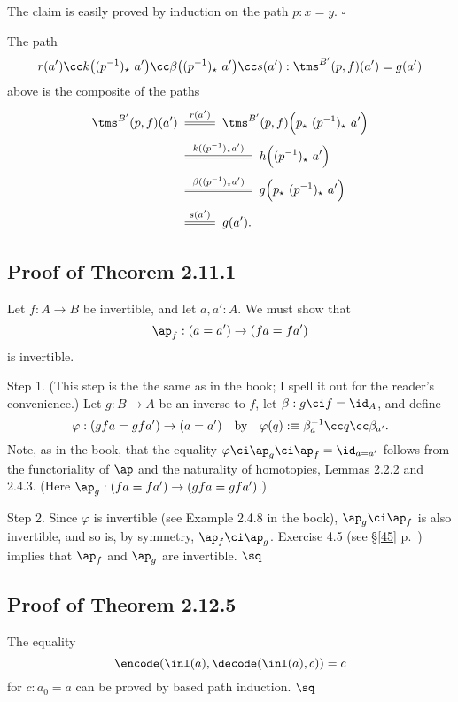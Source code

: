 \documentclass[12pt]{article}
\begin{document}
The claim is easily proved by induction on the path $p:x=y$. $\square$

The path 
$$
r(a')\cc k\big((p^{-1})_\star\ a'\big)\cc\beta\big((p^{-1})_\star\ a'\big)\cc s(a'):\tms^{B'}(p,f)(a')=g(a')
$$ 
above is the composite of the paths
\begin{align*}
\tms^{B'}(p,f)(a')&\xymatrix{\ar@1{=}[r]^{r(a')}&}\tms^{B'}(p,f)\Big(p_\star\ (p^{-1})_\star\ a'\Big)\\ 
&\xymatrix{\ar@1{=}[rr]^{k((p^{-1})_\star a')}&&}h\Big((p^{-1})_\star\ a'\Big)\\ 
&\xymatrix{\ar@1{=}[rr]^{\beta((p^{-1})_\star a')}&&}g\Big(p_\star\ (p^{-1})_\star\ a'\Big)\\ 
&\xymatrix{\ar@1{=}[r]^{s(a')}&}g(a').
\end{align*}


\subsection{Proof of Theorem 2.11.1}\label{2111}

Let $f:A\to B$ be invertible, and let $a,a':A$. We must show that 
$$
\ap_f:(a=a')\to (fa=fa')
$$ 
is invertible.

Step 1. (This step is the the same as in the book; I spell it out for the reader's convenience.) Let $g:B\to A$ be an inverse to $f$, let $\beta:g\ci f=\id_A$, and define 
$$
\varphi:(gfa=gfa')\to(a=a')\quad\text{by}\quad\varphi(q):\equiv\beta_a^{-1}\cc q\cc\beta_{a'}.
$$ 
Note, as in the book, that the equality $\varphi\ci\ap_g\ci\ap_f=\id_{a=a'}$ follows from the functoriality of $\ap$ and the naturality of homotopies, Lemmas 2.2.2 and 2.4.3. (Here $\ap_g:(fa=fa')\to (gfa=gfa')$.)

Step 2. Since $\varphi$ is invertible (see Example 2.4.8 in the book), $\ap_g\ci\ap_f$ is also invertible, and so is, by symmetry, $\ap_f\ci\ap_g$. Exercise 4.5 (see \S\ref{45} p.~\pageref{45}) implies that $\ap_f$ and $\ap_g$ are invertible. $\sq$


\subsection{Proof of Theorem 2.12.5}

The equality 
$$
\encode(\inl(a),\decode(\inl(a),c))=c
$$ 
for $c:a_0=a$ can be proved by based path induction. $\sq$

\end{document}
